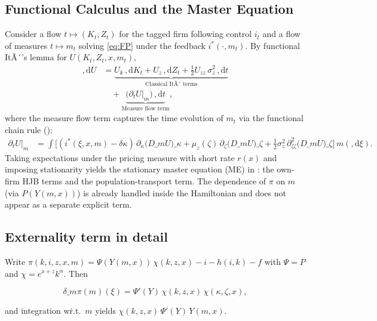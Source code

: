 \documentclass[11pt,letterpaper,oneside]{article}
\numberwithin{equation}{section}
\newcommand{\1}{\mathbf{1}}
\newcommand{\diff}{,\mathrm{d}}
\newcommand{\Dm}{D\_m}
\begin{document}
\subsection*{Functional Calculus and the Master Equation}\label{app:master-derivation}
Consider a flow $t\mapsto (K_t,Z_t)$ for the tagged firm following control $i_t$ and a flow of measures $t\mapsto m_t$ solving \eqref{eq:FP} under the feedback $i^*(\cdot,m_t)$. By functional ItÃ´'s lemma for $U(K_t,Z_t,x,m_t)$,
\begin{align*}
\diff U &= \underbrace{U_k\,\diff K_t + U_z\,\diff Z_t + \tfrac12 U_{zz}\,\sigma_z^2\,\diff t}_{\text{Classical ItÃ´ terms}} \\
        &\quad + \underbrace{\big(\partial_t U\big|_{m}\big)\,\diff t}_{\text{Measure flow term}},
\end{align*}
where the measure flow term captures the time evolution of $m_t$ via the functional chain rule ():
\begin{align*}
\partial_t U\big|_{m} &= \int \Big[ (i^*(\xi,x,m)-\delta\kappa)\,\partial_{\kappa}\big(\Dm U\big)\!\_\kappa
  +\mu_z(\zeta)\,\partial_{\zeta}\big(\Dm U\big)\!\_\zeta
  +\tfrac12\sigma_z^2\,\partial_{\zeta\zeta}^2\big(\Dm U\big)\!\_\zeta\Big] \, m(\diff \xi).
\end{align*}
Taking expectations under the pricing measure with short rate $r(x)$ and imposing stationarity yields the stationary master equation (ME) in : the own-firm HJB terms and the population-transport term. The dependence of $\pi$ on $m$ (via $P(Y(m,x))$) is already handled inside the Hamiltonian and does not appear as a separate explicit term.

\subsection*{Externality term in detail}
Write $\pi(k,i,z,x,m)=\Psi(Y(m,x))\,\chi(k,z,x)-i-h(i,k)-f$ with $\Psi=P$ and $\chi=e^{x+z}k^\alpha$. Then

$$
\delta\_m\pi(m)(\xi)=\Psi'(Y)\,\chi(k,z,x)\,\chi(\kappa,\zeta,x),
$$

and integration w\.r.t.\ $m$ yields $\chi(k,z,x)\,\Psi'(Y)\,Y(m,x)$.


\end{document}
